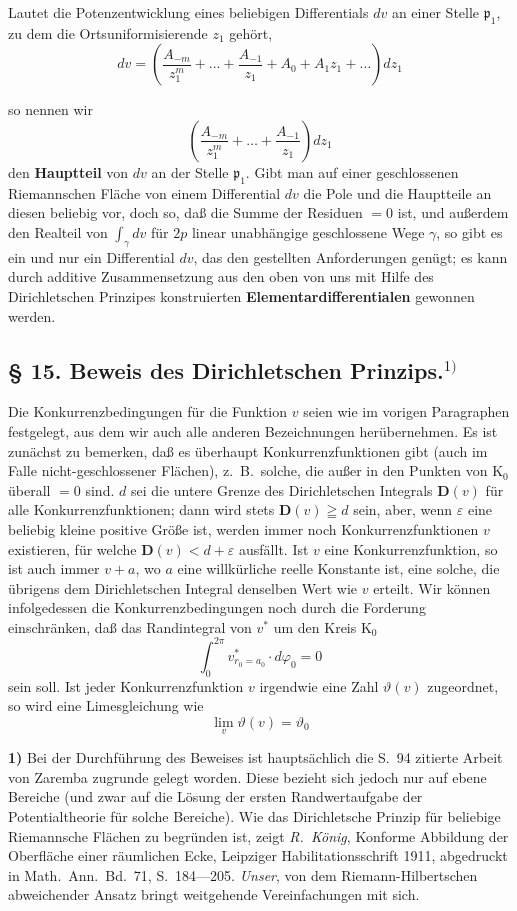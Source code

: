 \documentclass{article}
\begin{document}
Lautet die Potenzentwicklung eines beliebigen Differentials $dv$ an einer Stelle $\mathfrak{p}_1$, zu dem die Ortsuniformisierende $z_1$ gehört,
\[ dv = \left( \frac{A_{-m}}{z_1^m} + \dots + \frac{A_{-1}}{z_1} + A_0 + A_1 z_1 + \dots \right) dz_1 \]

so nennen wir
\[ \left( \frac{A_{-m}}{z_1^m} + \dots + \frac{A_{-1}}{z_1} \right) dz_1 \]
den \textbf{Hauptteil} von $dv$ an der Stelle $\mathfrak{p}_1$. Gibt man auf einer geschlossenen Riemannschen Fläche von einem Differential $dv$ die Pole und die Hauptteile an diesen beliebig vor, doch so, daß die Summe der Residuen $= 0$ ist, und außerdem den Realteil von $\displaystyle\int_\gamma dv$ für $2p$ linear unabhängige geschlossene Wege $\gamma$, so gibt es ein und nur ein Differential $dv$, das den gestellten Anforderungen genügt; es kann durch additive Zusammensetzung aus den oben von uns mit Hilfe des Dirichletschen Prinzipes konstruierten \textbf{Elementardifferentialen} gewonnen werden.

\subsection*{§ 15. Beweis des Dirichletschen Prinzips.${}^{1)}$}

Die Konkurrenzbedingungen für die Funktion $v$ seien wie im vorigen Paragraphen festgelegt, aus dem wir auch alle anderen Bezeichnungen herübernehmen. Es ist zunächst zu bemerken, daß es überhaupt Konkurrenzfunktionen gibt (auch im Falle nicht-geschlossener Flächen), z.~B.\ solche, die außer in den Punkten von $\mathrm{K}_0$ überall $= 0$ sind. $d$ sei die untere Grenze des Dirichletschen Integrals $\mathbf{D}(v)$ für alle Konkurrenzfunktionen; dann wird stets $\mathbf{D}(v) \geqq d$ sein, aber, wenn $\varepsilon$ eine beliebig kleine positive Größe ist, werden immer noch Konkurrenzfunktionen $v$ existieren, für welche $\mathbf{D}(v) < d + \varepsilon$ ausfällt. Ist $v$ eine Konkurrenzfunktion, so ist auch immer $v + a$, wo $a$ eine willkürliche reelle Konstante ist, eine solche, die übrigens dem Dirichletschen Integral denselben Wert wie $v$ erteilt. Wir können infolgedessen die Konkurrenzbedingungen noch durch die Forderung einschränken, daß das Randintegral von $v^*$ um den Kreis $\mathrm{K}_0$
\[ \int_0^{2\pi} v^*_{r_0 = a_0} \cdot d\varphi_0 = 0 \]
sein soll. Ist jeder Konkurrenzfunktion $v$ irgendwie eine Zahl $\vartheta(v)$ zugeordnet, so wird eine Limesgleichung wie
\[ \lim_v \vartheta(v) = \vartheta_0 \]

\textbf{1)} Bei der Durchführung des Beweises ist hauptsächlich die S.~94 zitierte Arbeit von Zaremba zugrunde gelegt worden. Diese bezieht sich jedoch nur auf ebene Bereiche (und zwar auf die Lösung der ersten Randwertaufgabe der Potentialtheorie für solche Bereiche). Wie das Dirichletsche Prinzip für beliebige Riemannsche Flächen zu begründen ist, zeigt \emph{R.~König}, Konforme Abbildung der Oberfläche einer räumlichen Ecke, Leipziger Habilitationsschrift 1911, abgedruckt in Math.\ Ann.\ Bd.~71, S.~184---205. \emph{Unser}, von dem Riemann-Hilbertschen abweichender Ansatz bringt weitgehende Vereinfachungen mit sich.
\end{document}
